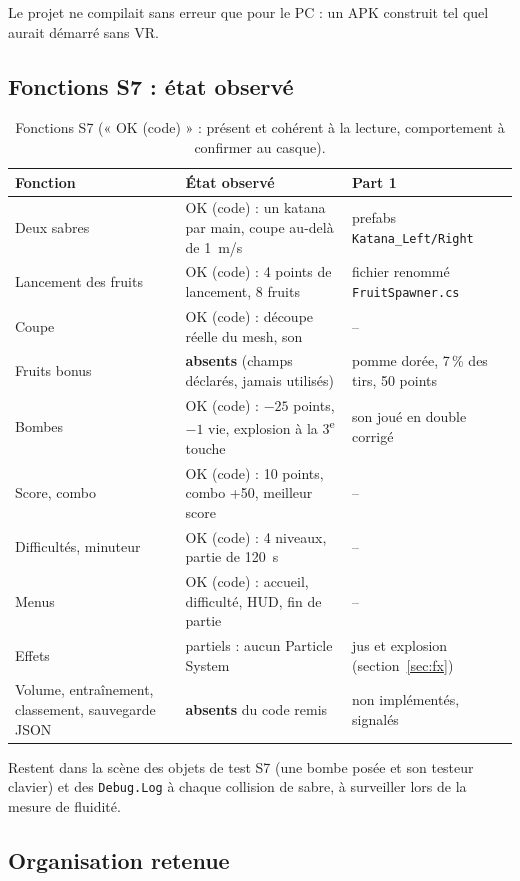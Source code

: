 \documentclass[11pt,a4paper]{article}
\newcommand{\fichier}[1]{\texttt{\small #1}}
\begin{document}
Le projet ne compilait sans erreur que pour le PC : un APK construit tel quel aurait démarré sans VR.

\subsection{Fonctions S7 : état observé}

\begin{table}[H]
\centering\small
\caption{Fonctions S7 (« OK (code) » : présent et cohérent à la lecture, comportement à confirmer au casque).}
\begin{tabularx}{\textwidth}{@{}P{3.2cm}LL@{}}
\toprule
Fonction & État observé & Part 1 \\
\midrule
Deux sabres & OK (code) : un katana par main, coupe au-delà de 1~m/s & prefabs \texttt{Katana\_Left/Right} \\
Lancement des fruits & OK (code) : 4 points de lancement, 8 fruits & fichier renommé \fichier{FruitSpawner.cs} \\
Coupe & OK (code) : découpe réelle du mesh, son & -- \\
Fruits bonus & \textbf{absents} (champs déclarés, jamais utilisés) & pomme dorée, 7\,\% des tirs, 50 points \\
Bombes & OK (code) : $-25$ points, $-1$ vie, explosion à la 3\textsuperscript{e} touche & son joué en double corrigé \\
Score, combo & OK (code) : 10 points, combo +50, meilleur score & -- \\
Difficultés, minuteur & OK (code) : 4 niveaux, partie de 120~s & -- \\
Menus & OK (code) : accueil, difficulté, HUD, fin de partie & -- \\
Effets & partiels : aucun Particle System & jus et explosion (section~\ref{sec:fx}) \\
Volume, entraînement, classement, sauvegarde JSON & \textbf{absents} du code remis & non implémentés, signalés \\
\bottomrule
\end{tabularx}
\end{table}

Restent dans la scène des objets de test S7 (une bombe posée et son testeur clavier) et des
\texttt{Debug.Log} à chaque collision de sabre, à surveiller lors de la mesure de fluidité.

\subsection{Organisation retenue}
\end{document}
